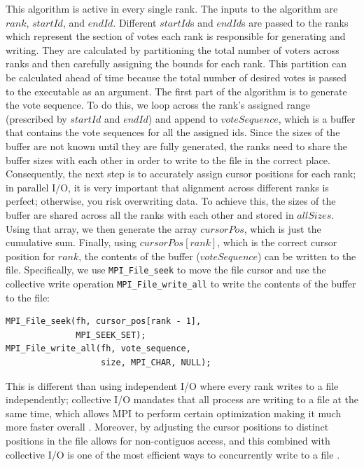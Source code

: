 \documentclass[final,5p,times,twocolumn,authoryear, 10pt]{elsarticle}
\newcommand{\C}[1]{\lstinline{#1}}
\begin{document}
This algorithm is active in every single rank. The inputs to the algorithm are
$rank$, $startId$, and $endId$. Different $startId$s and $endId$s are passed to
the ranks which represent the section of votes each rank is responsible for
generating and writing. They are calculated by partitioning the total number of
voters across ranks and then carefully assigning the bounds for each rank. This
partition can be calculated ahead of time because the total number of desired
votes is passed to the executable as an argument. The first part of the
algorithm is to generate the vote sequence. To do this, we loop across the
rank's assigned range (prescribed by $startId$ and $endId$) and append to
$voteSequence$, which is a buffer that contains the vote sequences for all the
assigned ids. Since the sizes of the buffer are not known until they are fully
generated, the ranks need to share the buffer sizes with each other in order to
write to the file in the correct place. Consequently, the next step is to
accurately assign cursor positions for each rank; in parallel I/O, it is very
important that alignment across different ranks is perfect; otherwise, you risk
overwriting data. To achieve this, the sizes of the buffer are shared across
all the ranks with each other and stored in $allSizes$. Using that array, we
then generate the array $cursorPos$, which is just the cumulative sum. Finally,
using $cursorPos[rank]$, which is the correct cursor position for $rank$, the
contents of the buffer ($voteSequence$) can be written to the file.
Specifically, we use \C{MPI_File_seek} to move the file cursor and use the
collective write operation \C{MPI_File_write_all} to write the contents of the
buffer to the file:
\begin{center}
    \begin{BVerbatim}
MPI_File_seek(fh, cursor_pos[rank - 1], 
              MPI_SEEK_SET);
MPI_File_write_all(fh, vote_sequence, 
                   size, MPI_CHAR, NULL);
    \end{BVerbatim}
\end{center}
This is different than using independent I/O where every
rank writes to a file independently; collective I/O mandates that all process
are writing to a file at the same time, which allows MPI to perform certain
optimization making it much more faster overall \cite{pacheco}. Moreover, by
adjusting the cursor positions to distinct positions in the file allows for
non-contiguos access, and this combined with collective I/O is one of the most
efficient ways to concurrently write to a file \cite{ching}.
\end{document}
